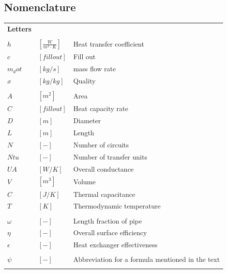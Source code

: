 \documentclass[]{article}
\begin{document}
\subsection*{Nomenclature}
\begin{longtable}{p{2cm} p{2cm} p{13cm}} %
\textbf{\textsf{\large Letters}}\\
\\
$h$			& $ \left[\frac{W}{m^{2}\cdot K} \right] $		&  Heat transfer coefficient\\
$c$			& $ \left[ fill out \right] $ &  Fill out\\ 
$m_dot$	& $ \left[ kg/s \right] $ &  mass flow rate\\ 
$x$	& $ \left[ kg/kg \right] $ &  Quality\\ 
 & & \\ %
$A$			& $ \left[ m^{2} \right] $	&  Area\\
$C$			& $ \left[ fill out \right] $	&  Heat capacity rate\\
$D$			& $ \left[ m \right] $			&  Diameter\\
$L$			& $ \left[ m 	\right] $ 		&  Length\\
$N$			& $ \left[ - 	\right] $ 		&  Number of circuits\\
$Ntu$			& $ \left[- 	\right] $ &  Number of transfer units\\
$UA$		& $ \left[ W/K \right] $ &  Overall conductance\\ 
$V$     & $ \left[m^{3} \right] $   &  Volume \\
$C$			& $ \left[J/K  \right] $ &  Thermal capacitance\\ 
$T$			& $ \left[K \right]					$ &  Thermodynamic temperature\\
 & & \\ %
$\omega$    & $ \left[ - \right] $        & Length fraction of pipe\\
$\eta$			& $ \left[ - \right] $ &  Overall surface efficiency\\ 
$\epsilon$	& $ \left[ - \right] $ &  Heat exchanger effectiveness\\ 

 & & \\ %
$\psi$    & $ \left[ - \right] $        & Abbreviation for a formula mentioned in the text\\
 & & \\ 
 

\end{longtable}
\end{document}
